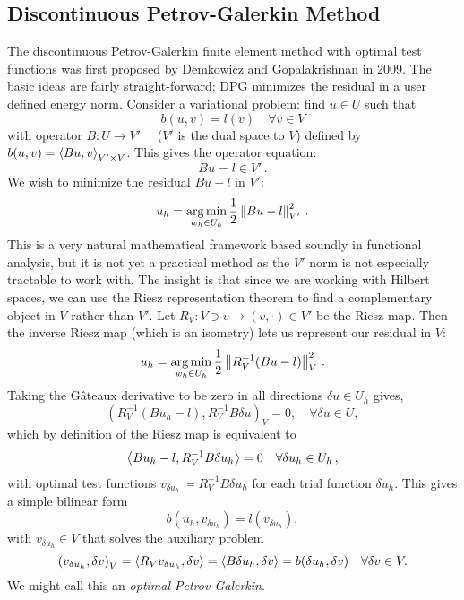 \documentclass[Proposal.tex]{subfiles}
\begin{document}

\subsection{Discontinuous Petrov-Galerkin Method}
The discontinuous Petrov-Galerkin finite element method with optimal test functions 
was first proposed by Demkowicz and Gopalakrishnan in 2009\cite{DPG1, DPG2}.
The basic ideas are fairly straight-forward; DPG minimizes the residual in a user defined energy norm.
Consider a variational problem: find $u\in U$ such that
\[
b(u,v)=l(v) \quad\forall v\in V
\]
with operator $B:U\rightarrow V'\quad$ ($V'$ is the dual space to $V$) defined by $b(u,v)=\left\langle Bu,v \right\rangle_{V'\times V}$.
This gives the operator equation:
\[
Bu=l\in V'\,.
\]
We wish to minimize the residual $Bu-l$ in $V'$:
\[
u_h=\operatorname*{arg\,min}_{w_h\in U_h}\frac{1}{2}\left\| Bu-l \right\|^2_{V'}\,.
\]
This is a very natural mathematical framework based soundly in functional analysis, but it is not yet a practical method as the $V'$ norm is not
especially tractable to work with.
The insight is that since we are working with Hilbert spaces, we can use the Riesz representation theorem to find a complementary object 
in $V$ rather than $V'$. Let $R_V:V\ni v\rightarrow(v,\cdot)\in V'$ be the Riesz map. 
Then the inverse Riesz map (which is an isometry) lets us represent our residual in $V$:
\[
u_h=\operatorname*{arg\,min}_{w_h\in U_h}\frac{1}{2}\left\| R_V^{-1}(Bu-l) \right\|^2_{V}\,.
\]
Taking the G\^ateaux derivative to be zero in all directions $\delta u \in
U_h$ gives,
\[
\left(R_V^{-1}(Bu_h-l),R_V^{-1}B\delta u\right)_V = 0, \quad \forall \delta u \in U,
\]
which by definition of the Riesz map is equivalent to 
\begin{equation*}
\left\langle Bu_h-l,R_V^{-1}B\delta u_h \right\rangle=0\quad\forall\delta u_h\in U_h\,,
\end{equation*}
with optimal test functions $v_{\delta u_h}\coloneqq R_V^{-1}B\delta u_h$ for each trial function $\delta u_h$.
This gives a simple bilinear form
\begin{equation*}
b(u_h,v_{\delta u_h})=l(v_{\delta u_h}),
\end{equation*}
with $v_{\delta u_h}\in V$ that solves the auxiliary problem
\begin{equation*}
\left( v_{\delta u_h},\delta v \right)_V=\left\langle R_Vv_{\delta u_h},\delta v \right\rangle
=\left\langle B\delta u_h,\delta v \right\rangle=b(\delta u_h,\delta v)\quad\forall\delta v\in V.
\end{equation*}
We might call this an \emph{optimal Petrov-Galerkin}.
\end{document}
